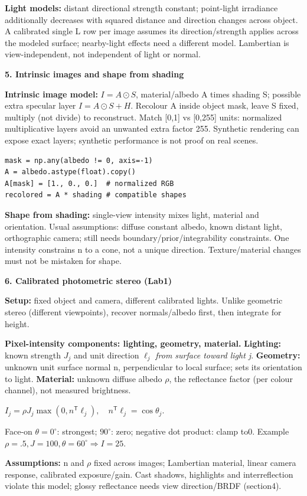 \documentclass[a4paper]{article}
\newcommand{\key}[1]{\textbf{#1}}
\newcommand{\Topic}[1]{\par\vspace{1.7pt}\noindent
  {\fontsize{7.7}{8.0}\selectfont\bfseries #1}\par\vspace{0.3pt}}
\newcommand{\eq}[1]{\par\noindent\mbox{\(\displaystyle #1\)}\par}
\newcommand{\trans}{^{\mathsf T}}
\newcounter{sheet}
\newcounter{sheetcolumn}
\newlength{\colwidth}
\newenvironment{sheetcol}[1][7.0]{\stepcounter{sheetcolumn}
  \begin{lrbox}{\columnbox}\begin{minipage}[t]{\colwidth}\vspace{0pt}
  \fontsize{#1}{\dimexpr#1pt+0.6pt\relax}\selectfont}
  {\end{minipage}\end{lrbox}
  \typeout{CV1COL|\thesheet|\thesheetcolumn|\the\dimexpr\ht\columnbox+\dp\columnbox\relax}
  \usebox{\columnbox}\ignorespacesafterend}
\newcommand{\Sep}{\hfill}
\begin{document}
\begin{sheetcol}
\key{Light models:} distant directional strength constant; point-light irradiance additionally decreases with squared distance and direction changes across object. A calibrated single L row per image assumes its direction/strength applies across the modeled surface; nearby-light effects need a different model. Lambertian is view-independent, not independent of light or normal.
\end{sheetcol}\Sep
\begin{sheetcol}[6.4]
\Topic{5. Intrinsic images and shape from shading}

\key{Intrinsic image model:} \(I=A\odot S\), material/albedo A times shading S; possible extra specular layer \(I=A\odot S+H\). Recolour A inside object mask, leave S fixed, multiply (not divide) to reconstruct. Match [0,1] vs [0,255] units: normalized multiplicative layers avoid an unwanted extra factor 255. Synthetic rendering can expose exact layers; synthetic performance is not proof on real scenes.
\begin{lstlisting}
mask = np.any(albedo != 0, axis=-1)
A = albedo.astype(float).copy()
A[mask] = [1., 0., 0.]  # normalized RGB
recolored = A * shading # compatible shapes
\end{lstlisting}
\key{Shape from shading:} single-view intensity mixes light, material and orientation. Usual assumptions: diffuse constant albedo, known distant light, orthographic camera; still needs boundary/prior/integrability constraints. One intensity constrains n to a cone, not a unique direction. Texture/material changes must not be mistaken for shape.

\Topic{6. Calibrated photometric stereo (Lab1)}
\key{Setup:} fixed object and camera, different calibrated lights. Unlike geometric stereo (different viewpoints), recover normals/albedo first, then integrate for height.

\key{Pixel-intensity components: lighting, geometry, material.}
\key{Lighting:} known strength \(J_j\) and unit direction \(\ell_j\) \emph{from surface toward light j}.
\key{Geometry:} unknown unit surface normal n, perpendicular to local surface; sets its orientation to light.
\key{Material:} unknown diffuse albedo \(\rho\), the reflectance factor (per colour channel), not measured brightness.
\eq{I_j=\rho J_j\max(0,n\trans\ell_j),\quad n\trans\ell_j=\cos\theta_j.}
Face-on \(\theta=0^\circ\): strongest; \(90^\circ\): zero; negative dot product: clamp to0. Example \(\rho=.5,J=100,\theta=60^\circ\Rightarrow I=25\).

\key{Assumptions:} n and \(\rho\) fixed across images; Lambertian material, linear camera response, calibrated exposure/gain. Cast shadows, highlights and interreflection violate this model; glossy reflectance needs view direction/BRDF (section4).


\end{sheetcol}
\end{document}
